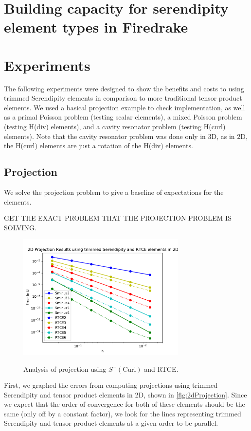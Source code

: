 \documentclass[manuscript,screen]{acmart}
\begin{document}
  \section{Building capacity for serendipity element types in Firedrake}

  \section{Experiments}
    
   The following experiments were designed to show the benefits and costs to using trimmed Serendipity elements in comparison to more traditional tensor product elements.  We used a basical projection example to check implementation, as well as a primal Poisson problem (testing scalar elements), a mixed Poisson problem (testing H(div) elements), and a cavity resonator problem (testing H(curl) elements).  Note that the cavity resonator problem was done only in 3D, as in 2D, the H(curl) elements are just a rotation of the H(div) elements. 


  \subsection{Projection}
  
  We solve the projection problem to give a baseline of expectations for the elements.  
  
  GET THE EXACT PROBLEM THAT THE PROJECTION PROBLEM IS SOLVING.

  \begin{figure}[h!]
    \caption{Analysis of projection using $S^-(\text{Curl})$ and RTCE.}
    \includegraphics[width=0.75\textwidth]{2dProjectionH.pdf}
    \label{fig:2dProjectionH}
  \end{figure}
  
  \noindent First, we graphed the errors from computing projections using trimmed Serendipity and tensor product elements in 2D, shown in \ref{fig:2dProjection}.  Since we expect that the order of convergence for both of these elements should be the same (only off by a constant factor), we look for the lines representing trimmed Serendipity and tensor product elements at a given order to be parallel.
\end{document}
